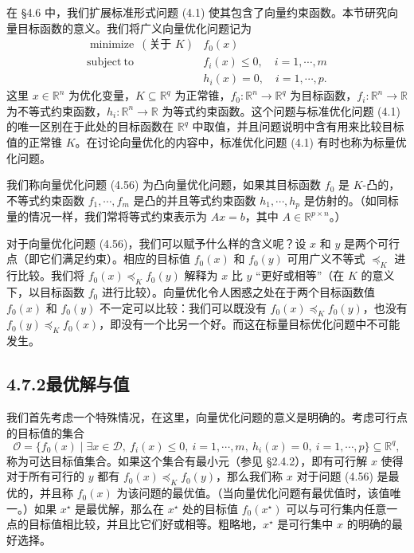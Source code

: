 \documentclass[UTF8, 12pt, fontset=fandol, oneside]{ctexart}
\begin{document}
在 \S 4.6 中，我们扩展标准形式问题 (4.1) 使其包含了向量约束函数。本节研究向量目标函数的意义。我们将广义向量优化问题记为
\begin{equation}
\begin{array}{ll}
\mathop{\mathrm{minimize}}\ (\text{关于 }K) & f_0(x)\\
\mathrm{subject\ to} & f_i(x)\leq 0,\quad i=1,\cdots,m\\
& h_i(x)=0,\quad i=1,\cdots,p.
\end{array}
\tag{4.56}
\end{equation}
这里 $x\in\mathbb{R}^n$ 为优化变量，$K\subseteq\mathbb{R}^q$ 为正常锥，$f_0:\mathbb{R}^n\to\mathbb{R}^q$ 为目标函数，$f_i:\mathbb{R}^n\to\mathbb{R}$ 为不等式约束函数，$h_i:\mathbb{R}^n\to\mathbb{R}$ 为等式约束函数。这个问题与标准优化问题 (4.1) 的唯一区别在于此处的目标函数在 $\mathbb{R}^q$ 中取值，并且问题说明中含有用来比较目标值的正常锥 $K$。在讨论向量优化的内容中，标准优化问题 (4.1) 有时也称为标量优化问题。

我们称向量优化问题 (4.56) 为凸向量优化问题，如果其目标函数 $f_0$ 是 $K$-凸的，不等式约束函数 $f_1,\cdots,f_m$ 是凸的并且等式约束函数 $h_1,\cdots,h_p$ 是仿射的。（如同标量的情况一样，我们常将等式约束表示为 $Ax=b$，其中 $A\in\mathbb{R}^{p\times n}$。）

对于向量优化问题 (4.56)，我们可以赋予什么样的含义呢？设 $x$ 和 $y$ 是两个可行点（即它们满足约束）。相应的目标值 $f_0(x)$ 和 $f_0(y)$ 可用广义不等式 $\preceq_K$ 进行比较。我们将 $f_0(x)\preceq_K f_0(y)$ 解释为 $x$ 比 $y$ “更好或相等”（在 $K$ 的意义下，以目标函数 $f_0$ 进行比较）。向量优化令人困惑之处在于两个目标函数值 $f_0(x)$ 和 $f_0(y)$ 不一定可以比较：我们可以既没有 $f_0(x)\preceq_K f_0(y)$，也没有 $f_0(y)\preceq_K f_0(x)$，即没有一个比另一个好。而这在标量目标优化问题中不可能发生。

\subsection*{4.7.2\quad 最优解与值}

我们首先考虑一个特殊情况，在这里，向量优化问题的意义是明确的。考虑可行点的目标值的集合
\[
\mathcal{O}=\{f_0(x)\mid \exists x\in\mathcal{D},\ f_i(x)\leq 0,\ i=1,\cdots,m,\ h_i(x)=0,\ i=1,\cdots,p\}\subseteq\mathbb{R}^q,
\]
称为可达目标值集合。如果这个集合有最小元（参见 \S 2.4.2），即有可行解 $x$ 使得对于所有可行的 $y$ 都有 $f_0(x)\preceq_K f_0(y)$，那么我们称 $x$ 对于问题 (4.56) 是最优的，并且称 $f_0(x)$ 为该问题的最优值。（当向量优化问题有最优值时，该值唯一。）如果 $x^\star$ 是最优解，那么在 $x^\star$ 处的目标值 $f_0(x^\star)$ 可以与可行集内任意一点的目标值相比较，并且比它们好或相等。粗略地，$x^\star$ 是可行集中 $x$ 的明确的最好选择。
\end{document}

